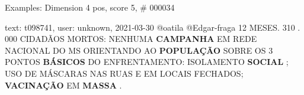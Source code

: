 \begin{frame}{Examples: Dimension 4 pos, score 5, \# 000034}
\footnotesize
\begin{exampleblock}{text: t098741, user: unknown, 2021-03-30}
@oatila @Edgar-fraga 12 MESES. 310 . 000 CIDADÃOS MORTOS: NENHUMA 
\textbf{CAMPANHA} EM REDE NACIONAL DO MS ORIENTANDO AO \textbf{POPULAÇÃO} SOBRE 
OS 3 PONTOS \textbf{BÁSICOS} DO ENFRENTAMENTO: ISOLAMENTO \textbf{SOCIAL} ; USO 
DE MÁSCARAS NAS RUAS E EM LOCAIS FECHADOS; \textbf{VACINAÇÃO} EM \textbf{MASSA} 
. 
\end{exampleblock}
\end{frame}
